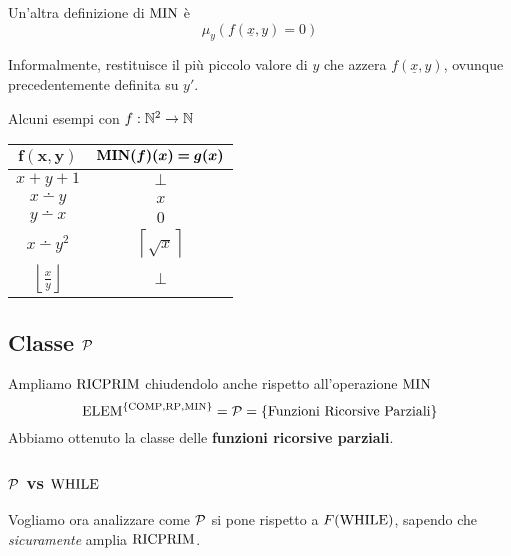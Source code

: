 Un'altra definizione di $\operatorname{MIN}$ è 
$$ \mu_y (f(\underline{x}, y) = 0)$$

Informalmente, restituisce il più piccolo valore di $y$ che azzera $f(\underline{x},y)$, ovunque precedentemente definita su $y'$.

Alcuni esempi con $f: \mathbb{N}^2 \rightarrow \mathbb{N}$
\begin{center}
	\begin{tabular}{c|c}
		$\bm{f(x,y)}$ & $\bm{\MIN(f)(x)=g(x)}$ \\ 
		\hline
		$x+y+1$ & $\bot$\\
		$x \dotminus y$ & $x$\\
		$y \dotminus x$ & $0$\\
		$x \dotminus y^2$ & $\left\lceil\sqrt{x}\right\rceil$\\
		$\left\lfloor\frac{x}{y}\right\rfloor$ & $\bot$\\
	\end{tabular}
\end{center}

\subsection{Classe $\mathcal{P}$}

Ampliamo $\text{RICPRIM}$ chiudendolo anche rispetto all'operazione $\operatorname{MIN}$
$$ \text{ELEM}^{\{\text{COMP}, \text{RP}, \operatorname{MIN}\}} = \mathcal{P} = \{\text{Funzioni Ricorsive Parziali}\}$$
Abbiamo ottenuto la classe delle \textbf{funzioni ricorsive parziali}.

\subsubsection{$\mathcal{P}$ vs $\text{WHILE}$}

Vogliamo ora analizzare come $\mathcal{P}$ si pone rispetto a $F(\text{WHILE})$, sapendo che \textit{sicuramente} amplia $\text{RICPRIM}$.\\

